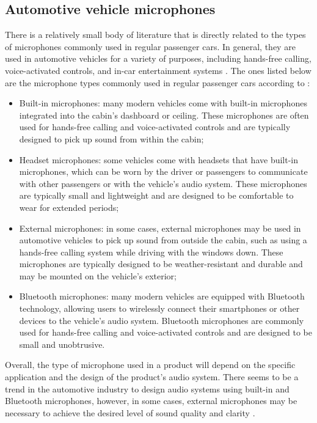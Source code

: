 \subsection{Automotive vehicle microphones}
\label{subsec:microphones_automotive_vehicle}

There is a relatively small body of literature that is directly related to the types of microphones commonly used in regular passenger cars. In general, they are used in automotive vehicles for a variety of purposes, including hands-free calling, voice-activated controls, and in-car entertainment systems \cite{Newcomb2008}. The ones listed below are the microphone types commonly used in regular passenger cars according to \textcite{Rumreich2005}:

\begin{itemize}
    \item Built-in microphones: many modern vehicles come with built-in microphones integrated into the cabin's dashboard or ceiling. These microphones are often used for hands-free calling and voice-activated controls and are typically designed to pick up sound from within the cabin;
    \item Headset microphones: some vehicles come with headsets that have built-in microphones, which can be worn by the driver or passengers to communicate with other passengers or with the vehicle's audio system. These microphones are typically small and lightweight and are designed to be comfortable to wear for extended periods;
    \item External microphones: in some cases, external microphones may be used in automotive vehicles to pick up sound from outside the cabin, such as using a hands-free calling system while driving with the windows down. These microphones are typically designed to be weather-resistant and durable and may be mounted on the vehicle's exterior;
    \item Bluetooth microphones: many modern vehicles are equipped with Bluetooth technology, allowing users to wirelessly connect their smartphones or other devices to the vehicle’s audio system. Bluetooth microphones are commonly used for hands-free calling and voice-activated controls and are designed to be small and unobtrusive.
\end{itemize}

Overall, the type of microphone used in a product will depend on the specific application and the design of the product's audio system. There seems to be a trend in the automotive industry to design audio systems using built-in and Bluetooth microphones, however, in some cases, external microphones may be necessary to achieve the desired level of sound quality and clarity \cite{Rayburn2004}.


